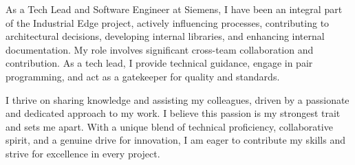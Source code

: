 

\begin{cvparagraph}

As a Tech Lead and Software Engineer at Siemens, I have been an integral part of the Industrial Edge project, actively influencing processes, contributing to architectural decisions, developing internal libraries, and enhancing internal documentation. My role involves significant cross-team collaboration and contribution. As a tech lead, I provide technical guidance, engage in pair programming, and act as a gatekeeper for quality and standards.

I thrive on sharing knowledge and assisting my colleagues, driven by a passionate and dedicated approach to my work. I believe this passion is my strongest trait and sets me apart. With a unique blend of technical proficiency, collaborative spirit, and a genuine drive for innovation, I am eager to contribute my skills and strive for excellence in every project.

\end{cvparagraph}
